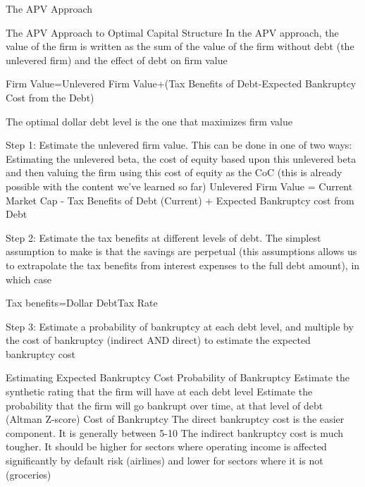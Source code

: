 \documentclass[10pt]{article}
\begin{document}
    \begin{core}{The APV Approach}

      The APV Approach to Optimal Capital Structure
      In the APV approach, the value of the firm is written as the sum of the value of the firm without debt (the unlevered firm) and the effect of debt on firm value

      Firm Value=Unlevered Firm Value+(Tax Benefits of Debt-Expected Bankruptcy Cost from the Debt)

      The optimal dollar debt level is the one that maximizes firm value

      Step 1: Estimate the unlevered firm value. This can be done in one of two ways:
      Estimating the unlevered beta, the cost of equity based upon this unlevered beta and then valuing the firm using this cost of equity as the CoC (this is already possible with the content we’ve learned so far)
      Unlevered Firm Value = Current Market Cap - Tax Benefits of Debt (Current) + Expected Bankruptcy cost from Debt

      Step 2: Estimate the tax benefits at different levels of debt. The simplest assumption to make is that the savings are perpetual (this assumptions allows us to extrapolate the tax benefits from interest expenses to the full debt amount), in which case

      Tax benefits=Dollar DebtTax Rate

      Step 3: Estimate a probability of bankruptcy at each debt level, and multiple by the cost of bankruptcy (indirect AND direct) to estimate the expected bankruptcy cost

      Estimating Expected Bankruptcy Cost
      Probability of Bankruptcy
      Estimate the synthetic rating that the firm will have at each debt level
      Estimate the probability that the firm will go bankrupt over time, at that level of debt (Altman Z-score) 
      Cost of Bankruptcy
      The direct bankruptcy cost is the easier component. It is generally between 5-10%
      The indirect bankruptcy cost is much tougher. It should be higher for sectors where operating income is affected significantly by default risk (airlines) and lower for sectors where it is not (groceries)

    \end{core}
\end{document}
